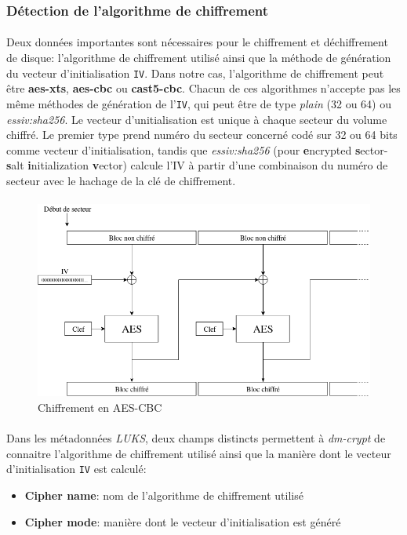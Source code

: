 \subsubsection{Détection de l'algorithme de chiffrement}
\paragraph{}
Deux données importantes sont nécessaires pour le chiffrement et déchiffrement
de disque: l'algorithme de chiffrement utilisé ainsi que la méthode de
génération du vecteur d'initialisation \texttt{IV}. Dans notre cas, l'algorithme
de chiffrement peut être \textbf{aes-xts}, \textbf{aes-cbc} ou
\textbf{cast5-cbc}. Chacun de ces algorithmes n'accepte pas les même méthodes de
génération de l'\texttt{IV}, qui peut être de type \textit{plain} (32 ou 64) ou
\textit{essiv:sha256}. Le vecteur d'unitialisation est unique à chaque secteur
du volume chiffré. Le premier type prend numéro du secteur concerné codé sur 32
ou 64 bits comme vecteur d'initialisation, tandis que \textit{essiv:sha256}
(pour \textbf{e}ncrypted \textbf{s}ector-\textbf{s}alt \textbf{i}nitialization
\textbf{v}ector) calcule l'IV à partir d'une combinaison du numéro de secteur
avec le hachage de la clé de chiffrement.
\paragraph{}
\begin{figure}[h]
\centering
\includegraphics[width=.9\linewidth]{choix_developpement/aes_cbc.png}
\caption{\label{fig:aes_cbc}Chiffrement en AES-CBC}
\end{figure}
\paragraph{}
Dans les métadonnées \textit{LUKS}, deux champs distincts permettent à
\textit{dm-crypt} de connaitre l'algorithme de chiffrement utilisé ainsi que la
manière dont le vecteur d'initialisation \texttt{IV} est calculé:
\begin{itemize}
\item \textbf{Cipher name}: nom de l'algorithme de chiffrement utilisé
\item \textbf{Cipher mode}: manière dont le vecteur d'initialisation est généré
\end{itemize}
